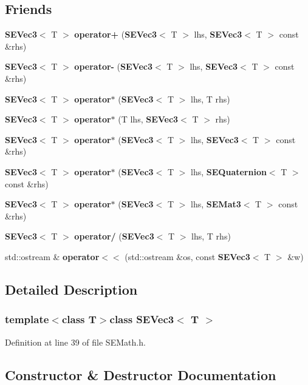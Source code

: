 \subsection*{Friends}
\begin{DoxyCompactItemize}
\item 
{\bf S\+E\+Vec3}$<$ T $>$ {\bf operator+} ({\bf S\+E\+Vec3}$<$ T $>$ lhs, {\bf S\+E\+Vec3}$<$ T $>$ const \&rhs)
\item 
{\bf S\+E\+Vec3}$<$ T $>$ {\bf operator-\/} ({\bf S\+E\+Vec3}$<$ T $>$ lhs, {\bf S\+E\+Vec3}$<$ T $>$ const \&rhs)
\item 
{\bf S\+E\+Vec3}$<$ T $>$ {\bf operator$\ast$} ({\bf S\+E\+Vec3}$<$ T $>$ lhs, T rhs)
\item 
{\bf S\+E\+Vec3}$<$ T $>$ {\bf operator$\ast$} (T lhs, {\bf S\+E\+Vec3}$<$ T $>$ rhs)
\item 
{\bf S\+E\+Vec3}$<$ T $>$ {\bf operator$\ast$} ({\bf S\+E\+Vec3}$<$ T $>$ lhs, {\bf S\+E\+Vec3}$<$ T $>$ const \&rhs)
\item 
{\bf S\+E\+Vec3}$<$ T $>$ {\bf operator$\ast$} ({\bf S\+E\+Vec3}$<$ T $>$ lhs, {\bf S\+E\+Quaternion}$<$ T $>$ const \&rhs)
\item 
{\bf S\+E\+Vec3}$<$ T $>$ {\bf operator$\ast$} ({\bf S\+E\+Vec3}$<$ T $>$ lhs, {\bf S\+E\+Mat3}$<$ T $>$ const \&rhs)
\item 
{\bf S\+E\+Vec3}$<$ T $>$ {\bf operator/} ({\bf S\+E\+Vec3}$<$ T $>$ lhs, T rhs)
\item 
std\+::ostream \& {\bf operator$<$$<$} (std\+::ostream \&os, const {\bf S\+E\+Vec3}$<$ T $>$ \&w)
\end{DoxyCompactItemize}


\subsection{Detailed Description}
\subsubsection*{template$<$class T$>$class S\+E\+Vec3$<$ T $>$}



Definition at line 39 of file S\+E\+Math.\+h.



\subsection{Constructor \& Destructor Documentation}
